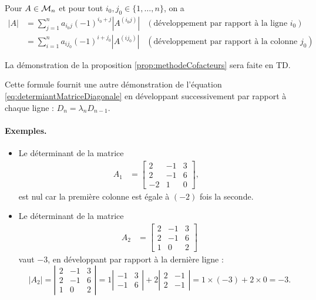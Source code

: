 \begin{proposition} \label{prop:methodeCofacteurs}
  Pour $A \in \mathcal{M}_n$ et pour tout $i_0, j_0 \in \{1, \dots, n\}$, on a 
  \begin{align*}
    |A| 
    & = \sum_{j=1}^n a_{i_0j} (-1)^{i_0+j} |A^{(i_0j)}| & (\text{développement par rapport à la ligne $i_0$}) \\
    & = \sum_{i=1}^n a_{ij_0} (-1)^{i+j_0} |A^{(ij_0)}| & (\text{développement par rapport à la colonne $j_0$})
  \end{align*}
\end{proposition}

La démonstration de la proposition \ref{prop:methodeCofacteurs} sera faite en TD. \eproof

\remark Cette formule fournit une autre démonstration de l'équation \eqref{eq:determiantMatriceDiagonale} en développant successivement par rapport à chaque ligne : $D_n = \lambda_n D_{n-1}$.

\paragraph*{Exemples.}
\begin{itemize}
  \item Le déterminant de la matrice 
  \begin{align*}
    A_1 & = \left[\begin{array}{rrr}
      2 & -1 & 3 \\ 2 & -1 & 6 \\ -2 & 1 & 0
      \end{array}\right], &
  \end{align*}
  est nul car la première colonne est égale à $(-2)$ fois la seconde.
  \item Le déterminant de la matrice
  \begin{align*}
    A_2 & = \left[\begin{array}{rrr}
      2 & -1 & 3 \\ 2 & -1 & 6 \\ 1 & 0  & 2
      \end{array}\right]
  \end{align*}
  vaut $-3$, en développant par rapport à la dernière ligne :
  $$
  |A_2|
  = \left|\begin{array}{rrr}
    2 & -1 & 3 \\ 2 & -1 & 6 \\ 1 & 0  & 2
    \end{array}\right|
  = 1 \left|\begin{array}{rr} -1 & 3 \\ -1 & 6 \end{array}\right|
  + 2 \left|\begin{array}{rr} 2 & -1 \\ 2 & -1 \end{array}\right|
  = 1 \times (-3) + 2 \times 0 = -3.
  $$
\end{itemize}



